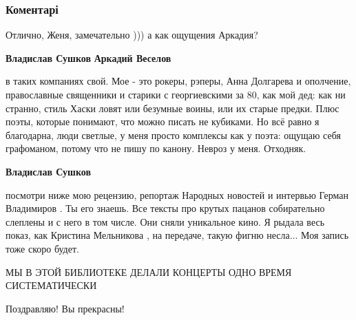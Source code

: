  
 
 
 
 
\subsubsection{Коментарі}
\label{sec:17_11_2021.fb.bilchenko_evgenia.2.pushkiniada_proletarskaja.cmt}

\begin{itemize} %
Отлично, Женя, замечательно ))) а как ощущения Аркадия?

\begin{itemize} %
\textbf{Владислав Сушков} \textbf{Аркадий Веселов} 

в таких компаниях свой. Мое - это рокеры, рэперы, Анна Долгарева и ополчение,
православные священники и старики с георгиевскими за 80, как мой дед: как ни
странно, стиль Хаски ловят или безумные воины, или их старые предки. Плюс
поэты, которые понимают, что можно писать не кубиками. Но всё равно я
благодарна, люди светлые, у меня просто комплексы как у поэта: ощущаю себя
графоманом, потому что не пишу по канону. Невроз у меня. Отходняк.

\textbf{Владислав Сушков} 

посмотри ниже мою рецензию, репортаж Народных новостей и интервью Герман
Владимиров . Ты его знаешь. Все тексты про крутых пацанов собирательно слеплены
и с него в том числе. Они сняли уникальное кино. Я рыдала весь показ, как
Кристина Мельникова , на передаче, такую фигню несла... Моя запись тоже скоро
будет.

\end{itemize} %

МЫ В ЭТОЙ БИБЛИОТЕКЕ ДЕЛАЛИ КОНЦЕРТЫ ОДНО ВРЕМЯ СИСТЕМАТИЧЕСКИ

Поздравляю! Вы прекрасны!

\end{itemize} %
